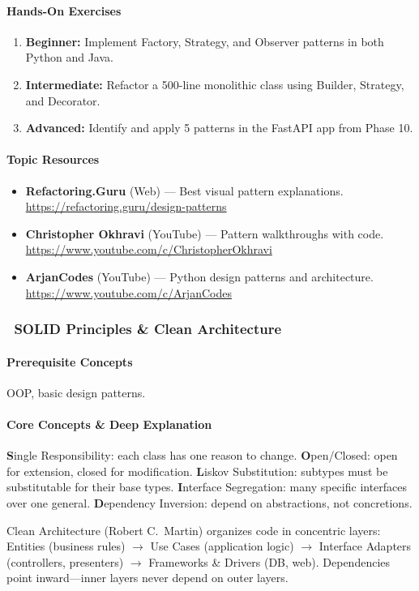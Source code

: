 \documentclass[11pt, a4paper, oneside]{report}
\newcommand{\mustmaster}[1]{\subsubsection{\texorpdfstring{\fcolorbox{blue!40!black}{blue!8}{\footnotesize\bfseries\color{blue!40!black} MUST MASTER}~#1}{#1}}}
\newcommand{\arrow}{$\rightarrow$}
\begin{document}
\paragraph{Hands-On Exercises}
\begin{enumerate}[leftmargin=*]
\item \textbf{Beginner:} Implement Factory, Strategy, and Observer patterns in both Python and Java.
\item \textbf{Intermediate:} Refactor a 500-line monolithic class using Builder, Strategy, and Decorator.
\item \textbf{Advanced:} Identify and apply 5 patterns in the FastAPI app from Phase 10.
\end{enumerate}

\paragraph{Topic Resources}
\begin{itemize}[leftmargin=*]
\item \textbf{Refactoring.Guru} (Web) --- Best visual pattern explanations. \url{https://refactoring.guru/design-patterns}
\item \textbf{Christopher Okhravi} (YouTube) --- Pattern walkthroughs with code. \url{https://www.youtube.com/c/ChristopherOkhravi}
\item \textbf{ArjanCodes} (YouTube) --- Python design patterns and architecture. \url{https://www.youtube.com/c/ArjanCodes}
\end{itemize}

\mustmaster{SOLID Principles \& Clean Architecture}

\paragraph{Prerequisite Concepts} OOP, basic design patterns.

\paragraph{Core Concepts \& Deep Explanation} \textbf{S}ingle Responsibility: each class has one reason to change. \textbf{O}pen/Closed: open for extension, closed for modification. \textbf{L}iskov Substitution: subtypes must be substitutable for their base types. \textbf{I}nterface Segregation: many specific interfaces over one general. \textbf{D}ependency Inversion: depend on abstractions, not concretions.

Clean Architecture (Robert C.\ Martin) organizes code in concentric layers: Entities (business rules) \arrow{} Use Cases (application logic) \arrow{} Interface Adapters (controllers, presenters) \arrow{} Frameworks \& Drivers (DB, web). Dependencies point inward---inner layers never depend on outer layers.
\end{document}
